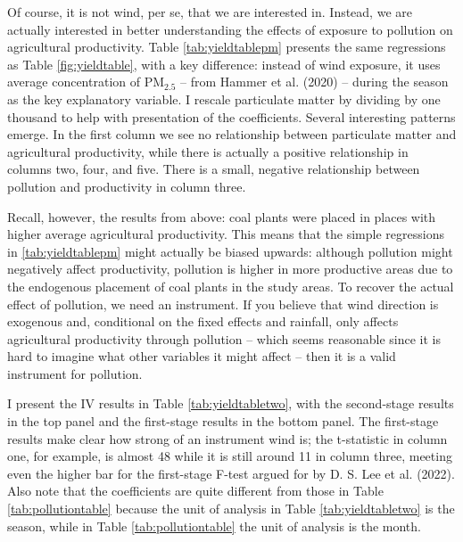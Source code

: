 \documentclass[
]{article}
\begin{document}
Of course, it is not wind, per se, that we are interested in. Instead, we are actually interested in better understanding the effects of exposure to pollution on agricultural productivity. Table \ref{tab:yieldtablepm} presents the same regressions as Table \ref{fig:yieldtable}, with a key difference: instead of wind exposure, it uses average concentration of \(\mathrm{PM_{2.5}}\) -- from Hammer et al. (2020) -- during the season as the key explanatory variable. I rescale particulate matter by dividing by one thousand to help with presentation of the coefficients. Several interesting patterns emerge. In the first column we see no relationship between particulate matter and agricultural productivity, while there is actually a positive relationship in columns two, four, and five. There is a small, negative relationship between pollution and productivity in column three.

Recall, however, the results from above: coal plants were placed in places with higher average agricultural productivity. This means that the simple regressions in \ref{tab:yieldtablepm} might actually be biased upwards: although pollution might negatively affect productivity, pollution is higher in more productive areas due to the endogenous placement of coal plants in the study areas. To recover the actual effect of pollution, we need an instrument. If you believe that wind direction is exogenous and, conditional on the fixed effects and rainfall, only affects agricultural productivity through pollution -- which seems reasonable since it is hard to imagine what other variables it might affect -- then it is a valid instrument for pollution.

I present the IV results in Table \ref{tab:yieldtabletwo}, with the second-stage results in the top panel and the first-stage results in the bottom panel. The first-stage results make clear how strong of an instrument wind is; the t-statistic in column one, for example, is almost 48 while it is still around 11 in column three, meeting even the higher bar for the first-stage F-test argued for by D. S. Lee et al. (2022). Also note that the coefficients are quite different from those in Table \ref{tab:pollutiontable} because the unit of analysis in Table \ref{tab:yieldtabletwo} is the season, while in Table \ref{tab:pollutiontable} the unit of analysis is the month.
\end{document}
